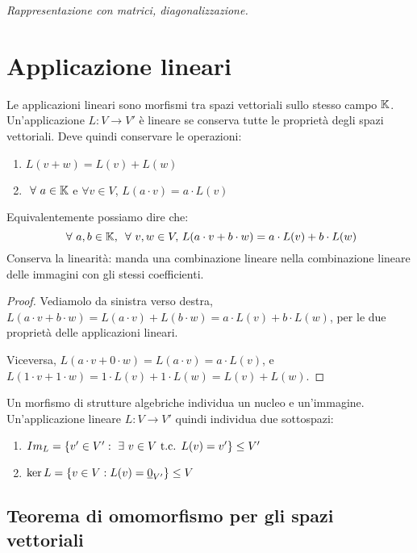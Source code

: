 \begin{center}
\indent
\textit{Rappresentazione con matrici, diagonalizzazione.}
\end{center}

\section{Applicazione lineari}

\begin{defn}
Le applicazioni lineari sono morfismi tra spazi vettoriali sullo stesso campo $\mathbb{K}$. Un'applicazione $L : V \to V'$ \`e lineare se conserva tutte le propriet\`a degli spazi vettoriali. Deve quindi conservare le operazioni:
\begin{enumerate}
    \item $L(v + w) = L(v) + L(w)$
    \item $ \forall a \in \field$ e $\forall v \in V$, $L(a \cdot v) = a \cdot L(v)$
\end{enumerate}
Equivalentemente possiamo dire che:
\[
\forall a, b \in \field , \, \forall v, w \in V , \, L(a \cdot v + b \cdot w) = a \cdot L(v) + b \cdot L(w)
\]
Conserva la linearit\`a: manda una combinazione lineare nella combinazione lineare delle immagini con gli stessi coefficienti.
\end{defn}
\begin{proof}
Vediamolo da sinistra verso destra, $L(a \cdot v + b \cdot w) = L(a \cdot v) + L(b \cdot w) = a \cdot L(v) + b \cdot L(w)$, per le due propriet\`a delle applicazioni lineari.

Viceversa, $L(a \cdot v + 0 \cdot w) = L(a \cdot v) = a \cdot L(v)$, e $L(1 \cdot v + 1 \cdot w) = 1 \cdot L(v) + 1 \cdot L(w) = L(v) + L(w)$.
\end{proof}

Un morfismo di strutture algebriche individua un nucleo e un'immagine. Un'applicazione lineare $L: V \to V'$ quindi individua due sottospazi:
\begin{enumerate}
    \item $\image{L} = \{ v' \in V' : \exists v \in V \text{ t.c. } L(v) = v' \} \le V'$
    \item $\ker L = \{ v \in V : L(v) = \underline{0}_{V'} \} \le V$
\end{enumerate}

\subsection{Teorema di omomorfismo per gli spazi vettoriali}

